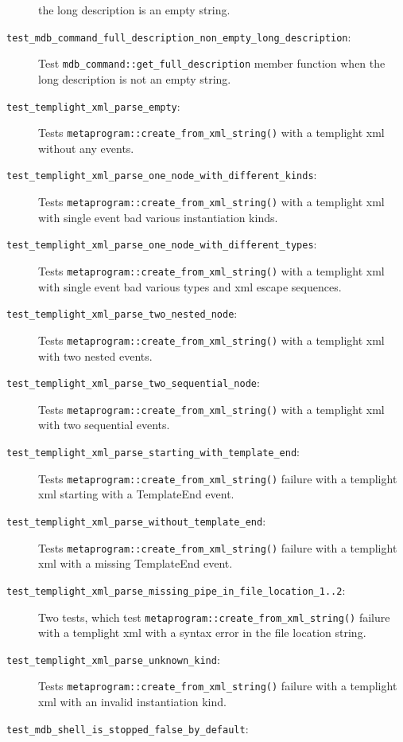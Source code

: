 \begin{description}
        the long description is an empty string.
    \item[\texttt{test\_mdb\_command\_full\_description\_non\_empty\_long\_description}:]
        Test \texttt{mdb\_command::get\_full\_description} member function when
        the long description is not an empty string.
    \item[\texttt{test\_templight\_xml\_parse\_empty}:]
        Tests \texttt{metaprogram::create\_from\_xml\_string()} with a templight
        xml without any events.
    \item[\texttt{test\_templight\_xml\_parse\_one\_node\_with\_different\_kinds}:]
        Tests \texttt{metaprogram::create\_from\_xml\_string()} with a templight
        xml with single event bad various instantiation kinds.
    \item[\texttt{test\_templight\_xml\_parse\_one\_node\_with\_different\_types}:]
        Tests \texttt{metaprogram::create\_from\_xml\_string()} with a templight
        xml with single event bad various types and xml escape sequences.
    \item[\texttt{test\_templight\_xml\_parse\_two\_nested\_node}:]
        Tests \texttt{metaprogram::create\_from\_xml\_string()} with a templight
        xml with two nested events.
    \item[\texttt{test\_templight\_xml\_parse\_two\_sequential\_node}:]
        Tests \texttt{metaprogram::create\_from\_xml\_string()} with a templight
        xml with two sequential events.
    \item[\texttt{test\_templight\_xml\_parse\_starting\_with\_template\_end}:]
        Tests \texttt{metaprogram::create\_from\_xml\_string()} failure with a
        templight xml starting with a TemplateEnd event.
    \item[\texttt{test\_templight\_xml\_parse\_without\_template\_end}:]
        Tests \texttt{metaprogram::create\_from\_xml\_string()} failure with a
        templight xml with a missing TemplateEnd event.
    \item[\texttt{test\_templight\_xml\_parse\_missing\_pipe\_in\_file\_location\_1..2}:]
        Two tests, which test \texttt{metaprogram::create\_from\_xml\_string()}
        failure with a templight xml with a syntax error in the file location
        string.
    \item[\texttt{test\_templight\_xml\_parse\_unknown\_kind}:]
        Tests \texttt{metaprogram::create\_from\_xml\_string()} failure with a
        templight xml with an invalid instantiation kind.
    \item[\texttt{test\_mdb\_shell\_is\_stopped\_false\_by\_default}:]

\end{description}
